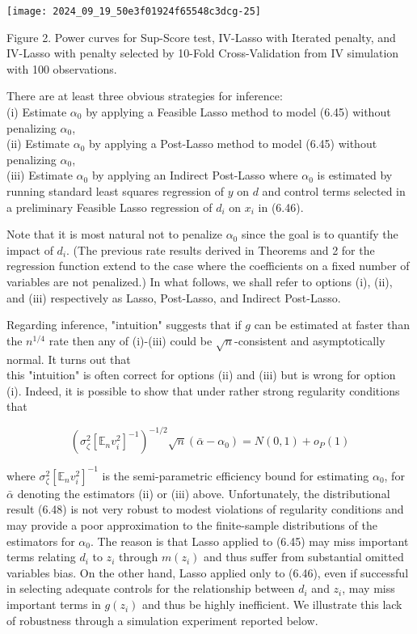 \documentclass[10pt]{article}
\begin{document}
\begin{center}
\texttt{[image: 2024\_09\_19\_50e3f01924f65548c3dcg-25]}
\end{center}

Figure 2. Power curves for Sup-Score test, IV-Lasso with Iterated penalty, and IV-Lasso with penalty selected by 10-Fold Cross-Validation from IV simulation with 100 observations.

There are at least three obvious strategies for inference:\\
(i) Estimate \(\alpha_{0}\) by applying a Feasible Lasso method to model (6.45) without penalizing \(\alpha_{0}\),\\
(ii) Estimate \(\alpha_{0}\) by applying a Post-Lasso method to model (6.45) without penalizing \(\alpha_{0}\),\\
(iii) Estimate \(\alpha_{0}\) by applying an Indirect Post-Lasso where \(\alpha_{0}\) is estimated by running standard least squares regression of \(y\) on \(d\) and control terms selected in a preliminary Feasible Lasso regression of \(d_{i}\) on \(x_{i}\) in (6.46).

Note that it is most natural not to penalize \(\alpha_{0}\) since the goal is to quantify the impact of \(d_{i}\). (The previous rate results derived in Theorems and 2 for the regression function extend to the case where the coefficients on a fixed number of variables are not penalized.) In what follows, we shall refer to options (i), (ii), and (iii) respectively as Lasso, Post-Lasso, and Indirect Post-Lasso.

Regarding inference, "intuition" suggests that if \(g\) can be estimated at faster than the \(n^{1 / 4}\) rate then any of (i)-(iii) could be \(\sqrt{n}\)-consistent and asymptotically normal. It turns out that\\
this "intuition" is often correct for options (ii) and (iii) but is wrong for option (i). Indeed, it is possible to show that under rather strong regularity conditions that

\[
\left(\sigma_{\zeta}^{2}\left[\mathbb{E}_{n} v_{i}^{2}\right]^{-1}\right)^{-1 / 2} \sqrt{n}\left(\bar{\alpha}-\alpha_{0}\right)=N(0,1)+o_{P}(1)
\]

where \(\sigma_{\zeta}^{2}\left[\mathbb{E}_{n} v_{i}^{2}\right]^{-1}\) is the semi-parametric efficiency bound for estimating \(\alpha_{0}\), for \(\bar{\alpha}\) denoting the estimators (ii) or (iii) above. Unfortunately, the distributional result (6.48) is not very robust to modest violations of regularity conditions and may provide a poor approximation to the finite-sample distributions of the estimators for \(\alpha_{0}\). The reason is that Lasso applied to (6.45) may miss important terms relating \(d_{i}\) to \(z_{i}\) through \(m\left(z_{i}\right)\) and thus suffer from substantial omitted variables bias. On the other hand, Lasso applied only to (6.46), even if successful in selecting adequate controls for the relationship between \(d_{i}\) and \(z_{i}\), may miss important terms in \(g\left(z_{i}\right)\) and thus be highly inefficient. We illustrate this lack of robustness through a simulation experiment reported below.
\end{document}
